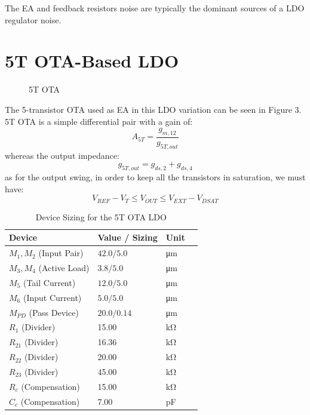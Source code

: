 \documentclass[journal]{IEEEtran}
\newcommand{\svg}[3]{
    \begin{figure}[!h]
        \centering
        
        \caption{#2}
    \end{figure}
}
\begin{document}
The EA and feedback resistors noise are typically the dominant sources of a LDO regulator noise.

\section{5T OTA-Based LDO}
\svg{../images/5t_ota.svg}{5T OTA}{0.6}
The 5-transistor OTA used as EA in this LDO variation can be seen in Figure 3. 5T OTA is a simple differential pair with a gain of:
\begin{equation}
    A_{5T}=\frac{g_{m,12}}{g_{5T,out}}
\end{equation}
whereas the output impedance:
\begin{equation}
    g_{5T,out}=g_{ds,2}+g_{ds,4}
\end{equation}
as for the output swing, in order to keep all the transistors in saturation, we must have:
\begin{equation}
    V_{REF} - V_{T} \leq V_{OUT} \leq V_{EXT} - V_{DSAT}
\end{equation}

\begin{table}[htbp]
    \centering
    \caption{Device Sizing for the 5T OTA LDO}
    \label{tab:sizing_5t}
    \begin{tabular}{@{}lllc@{}}
        \toprule
        \textbf{Device} & \textbf{Value / Sizing} & \textbf{Unit} \\
        \midrule
        $M_1, M_2$ (Input Pair) & $42.0 / 5.0$ & \unit{\micro\meter} \\
        $M_3, M_4$ (Active Load) & $3.8 / 5.0$ & \unit{\micro\meter} \\
        \midrule
        $M_5$ (Tail Current) & $12.0 / 5.0$ & \unit{\micro\meter} \\
        $M_6$ (Input Current) & $5.0 / 5.0$ & \unit{\micro\meter} \\
        \midrule
        $M_{PD}$ (Pass Device) & $20.0 / 0.14$ & \unit{\micro\meter} \\
        \midrule
        $R_1$ (Divider) & 15.00 & \unit{\kilo\ohm} \\
        $R_{21}$ (Divider) & 16.36 & \unit{\kilo\ohm} \\
        $R_{22}$ (Divider) & 20.00 & \unit{\kilo\ohm} \\
        $R_{23}$ (Divider) & 45.00 & \unit{\kilo\ohm} \\
        $R_c$ (Compensation) & 15.00 & \unit{\kilo\ohm} \\
        $C_c$ (Compensation) & 7.00 & \unit{\pico\farad} \\
        \bottomrule
    \end{tabular}
\end{table}
\end{document}
